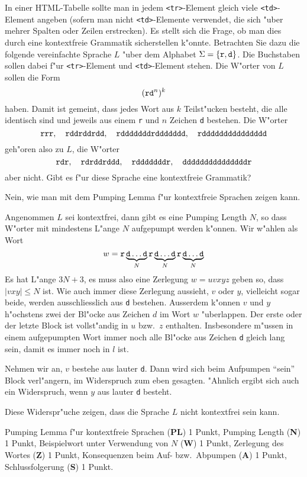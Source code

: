 In einer HTML-Tabelle sollte man in jedem {\tt <tr>}-Element gleich
viele {\tt <td>}-Element angeben (sofern man nicht {\tt <td>}-Elemente
verwendet, die sich "uber mehrer Spalten oder Zeilen erstrecken).
Es stellt sich die Frage, ob man dies durch eine kontextfreie Grammatik
sicherstellen k"onnte.
Betrachten Sie dazu die folgende vereinfachte Sprache $L$ "uber dem Alphabet
$\Sigma=\{\text{\tt r}, \text{\tt d}\}$. Die Buchstaben sollen
dabei f"ur {\tt <tr>}-Element und {\tt <td>}-Element stehen.
Die W"orter von $L$ sollen die Form
\[
(\text{\tt rd}^n)^k
\]
haben. Damit ist gemeint, dass jedes Wort aus $k$ Teilst"ucken besteht,
die alle identisch sind und jeweils aus einem {\tt r} und $n$ Zeichen
{\tt d} bestehen. Die W"orter
\[
\text{\tt rrr}, \quad
\text{\tt rddrddrdd},\quad
\text{\tt rdddddddrddddddd},\quad
\text{\tt rddddddddddddddd}
\]
geh"oren also zu $L$, die W"orter
\[
\text{\tt rdr}, \quad
\text{\tt rdrddrddd},\quad
\text{\tt rdddddddr},\quad
\text{\tt dddddddddddddddr}
\]
aber nicht.
Gibt es f"ur diese Sprache eine kontextfreie Grammatik?

\begin{loesung}
Nein, wie man mit dem Pumping Lemma f"ur kontextfreie Sprachen zeigen kann.

Angenommen $L$ sei kontextfrei, dann gibt es eine Pumping Length $N$, so
dass W"orter mit mindestens L"ange $N$ aufgepumpt werden k"onnen. 
Wir w"ahlen als Wort
\[
w=\text{\tt r}
\underbrace{\text{\tt d}\dots\text{\tt d}}_{N}
\text{\tt r}
\underbrace{\text{\tt d}\dots\text{\tt d}}_{N}
\text{\tt r}
\underbrace{\text{\tt d}\dots\text{\tt d}}_{N}
\]
Es hat L"ange $3N+3$, es muss also eine Zerlegung $w=uvxyz$ geben
so, dass $|vxy|\le N$ ist. Wie auch immer diese Zerlegung aussieht,
$v$ oder $y$, vielleicht sogar beide, werden ausschliesslich aus {\tt d}
bestehen. Ausserdem k"onnen $v$ und $y$ h"ochstens zwei der Bl"ocke
aus Zeichen $d$ im Wort $w$ "uberlappen. Der erste oder der letzte Block
ist vollst"andig in $u$ bzw.~$z$ enthalten. Insbesondere m"ussen in
einem aufgepumpten Wort immer noch alle Bl"ocke aus Zeichen {\tt d}
gleich lang sein, damit es immer noch in $l$ ist.

Nehmen wir an, $v$ bestehe aus lauter {\tt d}. Dann wird sich beim
Aufpumpen ``sein'' Block verl"angern, im Widerspruch zum eben gesagten.
"Ahnlich ergibt sich auch ein Widerspruch, wenn  $y$ aus lauter {\tt d}
besteht.

Diese Widerspr"uche zeigen, dass die Sprache $L$ nicht kontextfrei sein
kann.
\end{loesung}

\begin{bewertung}
Pumping Lemma f"ur kontextfreie Sprachen ({\bf PL}) 1 Punkt,
Pumping Length ({\bf N}) 1 Punkt,
Beispielwort unter Verwendung von $N$ ({\bf W}) 1 Punkt,
Zerlegung des Wortes ({\bf Z}) 1 Punkt,
Konsequenzen beim Auf- bzw.~Abpumpen ({\bf A}) 1 Punkt,
Schlussfolgerung ({\bf S}) 1 Punkt.
\end{bewertung}

